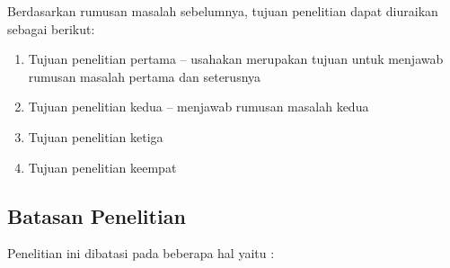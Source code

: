 Berdasarkan rumusan masalah sebelumnya, tujuan penelitian dapat
diuraikan sebagai berikut:

\begin{enumerate}
\def\labelenumi{\alph{enumi}.}
\item
  Tujuan penelitian pertama -- usahakan merupakan tujuan untuk menjawab
  rumusan masalah pertama dan seterusnya
\item
  Tujuan penelitian kedua -- menjawab rumusan masalah kedua
\item
  Tujuan penelitian ketiga
\item
  Tujuan penelitian keempat
\end{enumerate}

\hypertarget{batasan-penelitian}{%
\subsection{Batasan Penelitian}\label{batasan-penelitian}}

Penelitian ini dibatasi pada beberapa hal yaitu :

